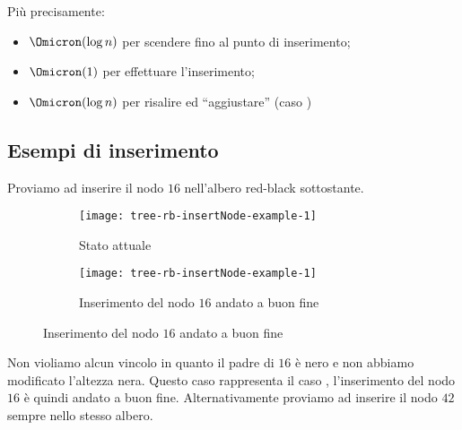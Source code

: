 Più precisamente:
\begin{itemize}
	\item \(\Omicron(\log n)\) per scendere fino al punto di inserimento;
	\item \(\Omicron(1)\) per effettuare l'inserimento;
	\item \(\Omicron(\log n)\) per risalire ed \enquote{aggiustare} (caso {\footnotesize{}})
\end{itemize}

\clearpage
\subsection*{Esempi di inserimento}

Proviamo ad inserire il nodo \(16\) nell'albero red-black sottostante.

\begin{figure}[H]\centering
	\begin{subfigure}[t]{.48\linewidth}\centering
		\texttt{[image: tree-rb-insertNode-example-1]}
		\caption{Stato attuale}
	\end{subfigure}
	\hfill
	\begin{subfigure}[t]{.48\linewidth}\centering
		\texttt{[image: tree-rb-insertNode-example-1]}
		\caption{Inserimento del nodo \(16\) andato a buon fine}
	\end{subfigure}
\end{figure}

\vspace{-5pt}
Non violiamo alcun vincolo in quanto il padre di \(16\) è nero e non abbiamo modificato l'altezza nera.
Questo caso rappresenta il caso {\footnotesize{}}, l'inserimento del nodo \(16\) è quindi andato a buon fine.
Alternativamente proviamo ad inserire il nodo \(42\) sempre nello stesso albero.

